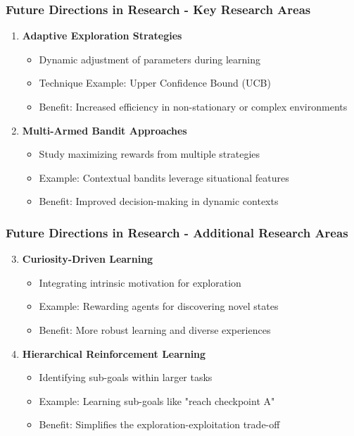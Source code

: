 \documentclass[aspectratio=169]{beamer}
\begin{document}
\begin{frame}[fragile]
    \frametitle{Future Directions in Research - Key Research Areas}
    \begin{enumerate}
        \item \textbf{Adaptive Exploration Strategies}
            \begin{itemize}
                \item Dynamic adjustment of parameters during learning
                \item Technique Example: Upper Confidence Bound (UCB)
                \item Benefit: Increased efficiency in non-stationary or complex environments
            \end{itemize}
        \item \textbf{Multi-Armed Bandit Approaches}
            \begin{itemize}
                \item Study maximizing rewards from multiple strategies
                \item Example: Contextual bandits leverage situational features
                \item Benefit: Improved decision-making in dynamic contexts
            \end{itemize}
    \end{enumerate}
\end{frame}

\begin{frame}[fragile]
    \frametitle{Future Directions in Research - Additional Research Areas}
    \begin{enumerate}
        \setcounter{enumi}{2} %
        \item \textbf{Curiosity-Driven Learning}
            \begin{itemize}
                \item Integrating intrinsic motivation for exploration
                \item Example: Rewarding agents for discovering novel states
                \item Benefit: More robust learning and diverse experiences
            \end{itemize}
        \item \textbf{Hierarchical Reinforcement Learning}
            \begin{itemize}
                \item Identifying sub-goals within larger tasks
                \item Example: Learning sub-goals like "reach checkpoint A"
                \item Benefit: Simplifies the exploration-exploitation trade-off
            \end{itemize}
    \end{enumerate}
\end{frame}
\end{document}
